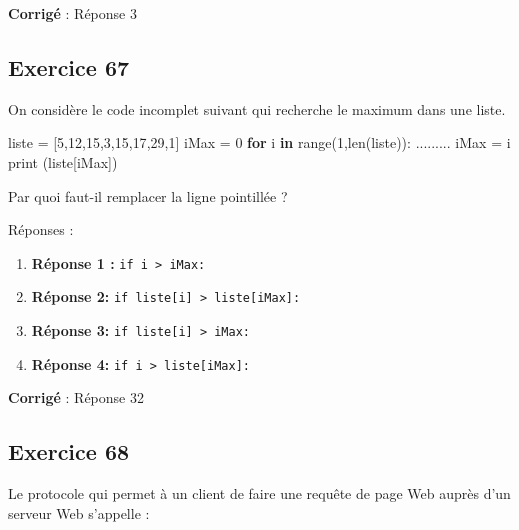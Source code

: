 \documentclass[11pt]{article}
\providecommand{\tightlist}{%
      \setlength{\itemsep}{0pt}\setlength{\parskip}{0pt}}
\newenvironment{Shaded}{}{}
\newcommand{\KeywordTok}[1]{\textcolor[rgb]{0.00,0.44,0.13}{\textbf{{#1}}}}
\newcommand{\DecValTok}[1]{\textcolor[rgb]{0.25,0.63,0.44}{{#1}}}
\newcommand{\NormalTok}[1]{{#1}}
\newcommand{\ControlFlowTok}[1]{\textcolor[rgb]{0.00,0.44,0.13}{\textbf{{#1}}}}
\newcommand{\OperatorTok}[1]{\textcolor[rgb]{0.40,0.40,0.40}{{#1}}}
\newcommand{\BuiltInTok}[1]{{#1}}
\begin{document}
    \textbf{Corrigé} : Réponse 3

    \hypertarget{exercice-67}{%
\subsection{Exercice 67}\label{exercice-67}}

On considère le code incomplet suivant qui recherche le maximum dans une
liste.

\begin{Shaded}
\begin{Highlighting}[]
\NormalTok{liste }\OperatorTok{=}\NormalTok{ [}\DecValTok{5}\NormalTok{,}\DecValTok{12}\NormalTok{,}\DecValTok{15}\NormalTok{,}\DecValTok{3}\NormalTok{,}\DecValTok{15}\NormalTok{,}\DecValTok{17}\NormalTok{,}\DecValTok{29}\NormalTok{,}\DecValTok{1}\NormalTok{]}
\NormalTok{iMax }\OperatorTok{=} \DecValTok{0}
\ControlFlowTok{for}\NormalTok{ i }\KeywordTok{in} \BuiltInTok{range}\NormalTok{(}\DecValTok{1}\NormalTok{,}\BuiltInTok{len}\NormalTok{(liste)):}
\NormalTok{    .........}
\NormalTok{iMax }\OperatorTok{=}\NormalTok{ i}
\BuiltInTok{print}\NormalTok{ (liste[iMax])}
\end{Highlighting}
\end{Shaded}

Par quoi faut-il remplacer la ligne pointillée ?

Réponses :

\begin{enumerate}
\def\labelenumi{\arabic{enumi}.}
\tightlist
\item
  \textbf{Réponse 1 :} \texttt{if\ i\ \textgreater{}\ iMax:}
\item
  \textbf{Réponse 2:}
  \texttt{if\ liste{[}i{]}\ \textgreater{}\ liste{[}iMax{]}:}
\item
  \textbf{Réponse 3:} \texttt{if\ liste{[}i{]}\ \textgreater{}\ iMax:}
\item
  \textbf{Réponse 4:} \texttt{if\ i\ \textgreater{}\ liste{[}iMax{]}:}
\end{enumerate}

    \textbf{Corrigé} : Réponse 32

    \hypertarget{exercice-68}{%
\subsection{Exercice 68}\label{exercice-68}}

Le protocole qui permet à un client de faire une requête de page Web
auprès d'un serveur Web s'appelle :
\end{document}
